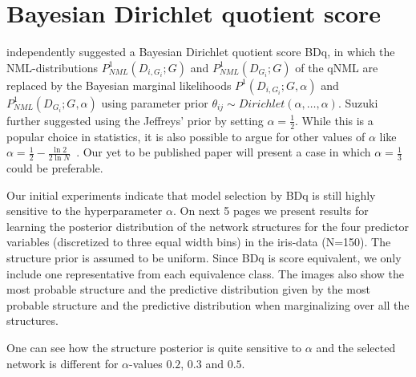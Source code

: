 \section{Bayesian Dirichlet quotient score}

\cite{Suzuki2017} independently suggested a Bayesian Dirichlet
quotient score BDq, in which the NML-distributions
$P^1_{NML}(D_{i,G_i};G)$ and $P^1_{NML}(D_{G_i};G)$ of the qNML are
replaced by the Bayesian marginal likelihoods
$P^1(D_{i,G_i};G,\alpha)$ and $P^1_{NML}(D_{G_i};G,\alpha)$ using
parameter prior $\theta_{ij} \sim
Dirichlet(\alpha,\ldots,\alpha)$. Suzuki further suggested using the
Jeffreys' prior by setting $\alpha=\frac{1}{2}$. While this is a
popular choice in statistics, it is also possible to argue for other
values of $\alpha$ like $\alpha=\frac{1}{2}-\frac{\ln 2}{2\ln
  N}$~\citep{watanabe15a}. Our yet to be published paper will present
a case in which $\alpha=\frac{1}{3}$ could be preferable.

Our initial experiments indicate that model selection by BDq is still
highly sensitive to the hyperparameter $\alpha$. On next 5 pages we
present results for learning the posterior distribution of the network
structures for the four predictor variables (discretized to three
equal width bins) in the iris-data (N=150). The structure prior is
assumed to be uniform. Since BDq is score equivalent, we only include
one representative from each equivalence class. The images also show
the most probable structure and the predictive distribution given by
the most probable structure and the predictive distribution when
marginalizing over all the structures.


One can see how the structure posterior is quite sensitive to $\alpha$
and the selected network is different for $\alpha$-values $0.2$, $0.3$
and $0.5$.




